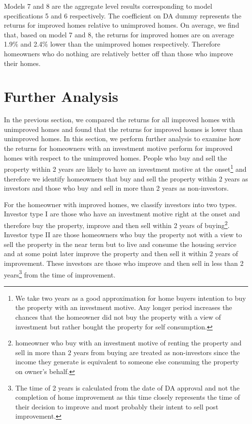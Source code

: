 \documentclass{article}
\begin{document}
Models 7 and 8 are the aggregate level results corresponding to model specifications 5 and 6 respectively. The coefficient on DA dummy represents the returns for improved homes relative to unimproved homes. On average, we find that, based on model 7 and 8, the returns for improved homes are on average 1.9\% and 2.4\% lower than the unimproved homes respectively. Therefore homeowners who do nothing are relatively better off than those who improve their homes. 

\clearpage
\section{Further Analysis}

In the previous section, we compared the returns for all improved homes with unimproved homes and found that the returns for improved homes is lower than unimproved homes. In this section, we perform further analysis to examine how the returns for homeowners with an investment motive perform for improved homes with respect to the unimproved homes. People who buy and sell the property within 2 years are likely to have an investment motive at the onset\footnote{We take two years as a good approximation for home buyers intention to buy the property with an investment motive. Any longer period increases the chances that the homeowner did not buy the property with a view of investment but rather bought the property for self consumption.} and therefore we identify homeowners that buy and sell the property within 2 years as investors and those who buy and sell in more than 2 years as non-investors. 



For the homeowner with improved homes, we classify investors into two types. Investor type I are those who have an investment motive right at the onset and therefore buy the property, improve and then sell within 2 years of buying\footnote{homeowner who buy with an investment motive of renting the property and sell in more than 2 years from buying are treated as non-investors since the income they generate is equivalent to someone else consuming the property on owner's behalf.}. Investor type II are those homeowners who buy the property not with a view to sell the property in the near term but to live and consume the housing service and at some point later improve the property and then sell it within 2 years of improvement. These investors are those who improve and then sell in less than 2 years\footnote{The time of 2 years is calculated from the date of DA approval and not the completion of home improvement as this time closely represents the time of their decision to improve and most probably their intent to sell post improvement.} from the time of improvement. 
\end{document}
